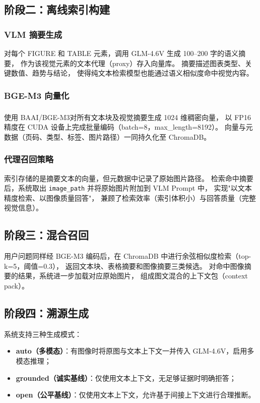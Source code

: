 ﻿\documentclass[UTF8, heading=true]{ctexart}
\newcommand{\upcite}[1]{\textsuperscript{\textsuperscript{\cite{#1}}}}
\begin{document}
\subsection{阶段二：离线索引构建}

\subsubsection{VLM 摘要生成}

对每个 FIGURE 和 TABLE 元素，调用 GLM-4.6V 生成 100–200 字的语义摘要，
作为该视觉元素的文本代理（proxy）存入向量库。
摘要描述图表类型、关键数值、趋势与结论，
使得纯文本检索模型也能通过语义相似度命中视觉内容。

\subsubsection{BGE-M3 向量化}

使用 BAAI/BGE-M3\upcite{bgem3}对所有文本块及视觉摘要生成 1024 维稠密向量，
以 FP16 精度在 CUDA 设备上完成批量编码（batch=8，max\_length=8192）。
向量与元数据（页码、类型、标签、图片路径）一同持久化至 ChromaDB。

\subsubsection{代理召回策略}

索引存储的是摘要文本的向量，但元数据中记录了原始图片路径。
检索命中摘要后，系统取出 \texttt{image\_path} 并将原始图片附加到 VLM Prompt 中，
实现"以文本精度检索、以图像质量回答"，
兼顾了检索效率（索引体积小）与回答质量（完整视觉信息）。

\subsection{阶段三：混合召回}

用户问题同样经 BGE-M3 编码后，在 ChromaDB 中进行余弦相似度检索（top-k=5，阈值=0.3），
返回文本块、表格摘要和图像摘要三类候选。
对命中图像摘要的结果，系统进一步加载对应原始图片，
组成图文混合的上下文包（context pack）。

\subsection{阶段四：溯源生成}

系统支持三种生成模式：
\begin{itemize}
    \item \textbf{auto（多模态）}：有图像时将原图与文本上下文一并传入 GLM-4.6V，启用多模态推理；
    \item \textbf{grounded（诚实基线）}：仅使用文本上下文，无足够证据时明确拒答；
    \item \textbf{open（公平基线）}：仅使用文本上下文，允许基于间接上下文进行合理推断。
\end{itemize}
\end{document}
